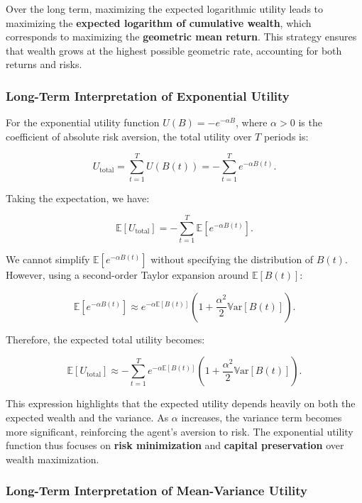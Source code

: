 Over the long term, maximizing the expected logarithmic utility leads to maximizing the \textbf{expected logarithm of cumulative wealth}, which corresponds to maximizing the \textbf{geometric mean return}. This strategy ensures that wealth grows at the highest possible geometric rate, accounting for both returns and risks.

\subsubsection{Long-Term Interpretation of Exponential Utility}

For the exponential utility function \( U(B) = -e^{ -\alpha B } \), where \( \alpha > 0 \) is the coefficient of absolute risk aversion, the total utility over \( T \) periods is:

\[
U_{\text{total}} = \sum_{t=1}^{T} U( B(t) ) = -\sum_{t=1}^{T} e^{ -\alpha B(t) }.
\]

Taking the expectation, we have:

\[
\mathbb{E}[ U_{\text{total}} ] = -\sum_{t=1}^{T} \mathbb{E}\left[ e^{ -\alpha B(t) } \right ].
\]

We cannot simplify \( \mathbb{E}\left[ e^{ -\alpha B(t) } \right ] \) without specifying the distribution of \( B(t) \). However, using a second-order Taylor expansion around \( \mathbb{E}[ B(t) ] \):

\[
\mathbb{E}\left[ e^{ -\alpha B(t) } \right ] \approx e^{ -\alpha \mathbb{E}[ B(t) ] } \left( 1 + \frac{ \alpha^2 }{2} \mathbb{V}\mathrm{ar}[ B(t) ] \right).
\]

Therefore, the expected total utility becomes:

\[
\mathbb{E}[ U_{\text{total}} ] \approx -\sum_{t=1}^{T} e^{ -\alpha \mathbb{E}[ B(t) ] } \left( 1 + \frac{ \alpha^2 }{2} \mathbb{V}\mathrm{ar}[ B(t) ] \right).
\]

This expression highlights that the expected utility depends heavily on both the expected wealth and the variance. As \( \alpha \) increases, the variance term becomes more significant, reinforcing the agent's aversion to risk. The exponential utility function thus focuses on \textbf{risk minimization} and \textbf{capital preservation} over wealth maximization.

\subsubsection{Long-Term Interpretation of Mean-Variance Utility}


